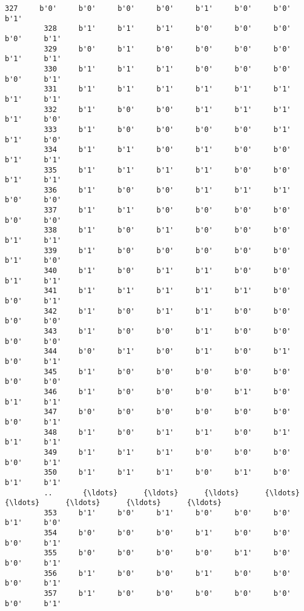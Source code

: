 \documentclass[11pt]{article}
\begin{document}
\begin{Verbatim}[commandchars=\\\{\}]
         327     b'0'     b'0'     b'0'     b'0'     b'1'     b'0'     b'0'     b'1'   
         328     b'1'     b'1'     b'1'     b'0'     b'0'     b'0'     b'0'     b'1'   
         329     b'0'     b'1'     b'0'     b'0'     b'0'     b'0'     b'1'     b'1'   
         330     b'1'     b'1'     b'1'     b'0'     b'0'     b'0'     b'0'     b'1'   
         331     b'1'     b'1'     b'1'     b'1'     b'1'     b'1'     b'1'     b'1'   
         332     b'1'     b'0'     b'0'     b'1'     b'1'     b'1'     b'1'     b'0'   
         333     b'1'     b'0'     b'0'     b'0'     b'0'     b'1'     b'1'     b'0'   
         334     b'1'     b'1'     b'0'     b'1'     b'0'     b'0'     b'1'     b'1'   
         335     b'1'     b'1'     b'1'     b'1'     b'0'     b'0'     b'1'     b'1'   
         336     b'1'     b'0'     b'0'     b'1'     b'1'     b'1'     b'0'     b'0'   
         337     b'1'     b'1'     b'0'     b'0'     b'0'     b'0'     b'0'     b'0'   
         338     b'1'     b'0'     b'1'     b'0'     b'0'     b'0'     b'1'     b'1'   
         339     b'1'     b'0'     b'0'     b'0'     b'0'     b'0'     b'1'     b'0'   
         340     b'1'     b'0'     b'1'     b'1'     b'0'     b'0'     b'1'     b'1'   
         341     b'1'     b'1'     b'1'     b'1'     b'1'     b'0'     b'0'     b'1'   
         342     b'1'     b'0'     b'1'     b'1'     b'0'     b'0'     b'0'     b'0'   
         343     b'1'     b'0'     b'0'     b'1'     b'0'     b'0'     b'0'     b'0'   
         344     b'0'     b'1'     b'0'     b'1'     b'0'     b'1'     b'0'     b'1'   
         345     b'1'     b'0'     b'0'     b'0'     b'0'     b'0'     b'0'     b'0'   
         346     b'1'     b'0'     b'0'     b'0'     b'1'     b'0'     b'1'     b'1'   
         347     b'0'     b'0'     b'0'     b'0'     b'0'     b'0'     b'0'     b'1'   
         348     b'1'     b'0'     b'1'     b'1'     b'0'     b'1'     b'1'     b'1'   
         349     b'1'     b'1'     b'1'     b'0'     b'0'     b'0'     b'0'     b'1'   
         350     b'1'     b'1'     b'1'     b'0'     b'1'     b'0'     b'1'     b'1'   
         ..       {\ldots}      {\ldots}      {\ldots}      {\ldots}      {\ldots}      {\ldots}      {\ldots}      {\ldots}   
         353     b'1'     b'0'     b'1'     b'0'     b'0'     b'0'     b'1'     b'0'   
         354     b'0'     b'0'     b'0'     b'1'     b'0'     b'0'     b'0'     b'1'   
         355     b'0'     b'0'     b'0'     b'0'     b'1'     b'0'     b'0'     b'1'   
         356     b'1'     b'0'     b'0'     b'1'     b'0'     b'0'     b'0'     b'1'   
         357     b'1'     b'0'     b'0'     b'0'     b'0'     b'0'     b'0'     b'1'   

\end{Verbatim}
\end{document}
